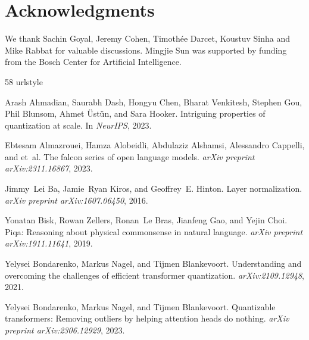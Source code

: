 \documentclass[10pt]{article}
\theoremstyle{definition}
\theoremstyle{plain}
\begin{document}
\section*{Acknowledgments} 
We thank Sachin Goyal, Jeremy Cohen, Timothée Darcet, Koustuv Sinha and Mike Rabbat for valuable discussions. Mingjie Sun was supported by funding from the Bosch Center for Artificial Intelligence. 


\begin{thebibliography}{58}
\providecommand{\natexlab}[1]{#1}
\providecommand{\url}[1]{\texttt{#1}}
\expandafter\ifx\csname urlstyle\endcsname\relax
  \providecommand{\doi}[1]{doi: #1}\else
  \providecommand{\doi}{doi: \begingroup \urlstyle{rm}\Url}\fi

Arash Ahmadian, Saurabh Dash, Hongyu Chen, Bharat Venkitesh, Stephen Gou, Phil Blunsom, Ahmet Üstün, and Sara Hooker.
\newblock Intriguing properties of quantization at scale.
\newblock In \emph{NeurIPS}, 2023.

Ebtesam Almazrouei, Hamza Alobeidli, Abdulaziz Alshamsi, Alessandro Cappelli, and et~al.
\newblock The falcon series of open language models.
\newblock \emph{arXiv preprint arXiv:2311.16867}, 2023.

Jimmy~Lei Ba, Jamie~Ryan Kiros, and Geoffrey~E. Hinton.
\newblock Layer normalization.
\newblock \emph{arXiv preprint arXiv:1607.06450}, 2016.

Yonatan Bisk, Rowan Zellers, Ronan~Le Bras, Jianfeng Gao, and Yejin Choi.
\newblock Piqa: Reasoning about physical commonsense in natural language.
\newblock \emph{arXiv preprint arXiv:1911.11641}, 2019.

Yelysei Bondarenko, Markus Nagel, and Tijmen Blankevoort.
\newblock Understanding and overcoming the challenges of efficient transformer quantization.
\newblock \emph{arXiv:2109.12948}, 2021.

Yelysei Bondarenko, Markus Nagel, and Tijmen Blankevoort.
\newblock Quantizable transformers: Removing outliers by helping attention heads do nothing.
\newblock \emph{arXiv preprint arXiv:2306.12929}, 2023.


\end{thebibliography}
\end{document}

